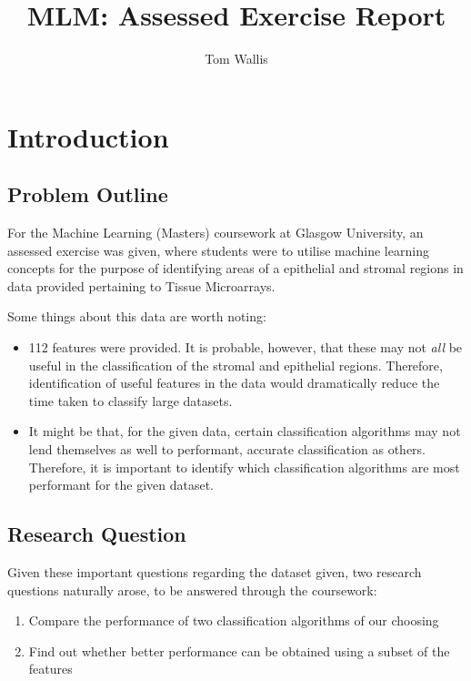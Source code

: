 \documentclass{tufte-handout}
\author{Tom Wallis}
\date{}
\title{MLM\@: Assessed Exercise Report}
\begin{document}
\maketitle

\section{Introduction}

\subsection{Problem Outline}
For the Machine Learning (Masters) coursework at Glasgow University, an assessed exercise was given, where students were to utilise machine learning concepts for the purpose of identifying areas of a epithelial and stromal regions in data provided pertaining to Tissue Microarrays.\par

Some things about this data are worth noting:

\begin{itemize}
    \item 112 features were provided. It is probable, however, that these may not \emph{all} be useful in the classification of the stromal and epithelial regions. Therefore, identification of useful features in the data would dramatically reduce the time taken to classify large datasets.
    \item It might be that, for the given data, certain classification algorithms may not lend themselves as well to performant, accurate classification as others. Therefore, it is important to identify which classification algorithms are most performant for the given dataset.
\end{itemize}

\subsection{Research Question}
Given these important questions regarding the dataset given, two research questions naturally arose, to be answered through the coursework:

\begin{enumerate}
    \item Compare the performance of two classification algorithms of our choosing
    \item Find out whether better performance can be obtained using a subset of the features
\end{enumerate}
\end{document}
